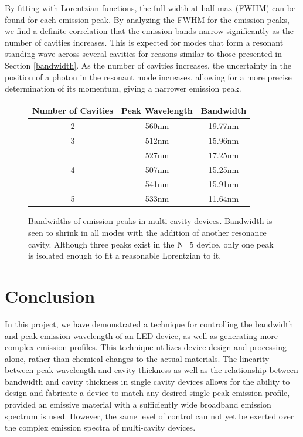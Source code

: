 \documentclass{report}
\begin{document}
        By fitting with Lorentzian functions, the full width at half max (FWHM) can be found for each emission peak. By analyzing the FWHM for the emission peaks, we find a definite correlation that the emission bands narrow significantly as the number of cavities increases. This is expected for modes that form a resonant standing wave across several cavities for reasons similar to those presented in Section \ref{bandwidth}. As the number of cavities increases, the uncertainty in the position of a photon in the resonant mode increases, allowing for a more precise determination of its momentum, giving a narrower emission peak.
        \begin{figure}
            \centering
            \renewcommand{\arraystretch}{1.5}
            \setlength{\tabcolsep}{15pt}
            \begin{tabular}{|c|c|c|}
                \hline
                Number of Cavities & Peak Wavelength & Bandwidth \\
                \hline
                2 & 560nm & 19.77nm \\
                \hline
                3 & 512nm & 15.96nm \\
                  & 527nm & 17.25nm \\
                \hline
                4 & 507nm & 15.25nm \\
                  & 541nm & 15.91nm \\
                \hline
                5 & 533nm & 11.64nm \\
                \hline
            \end{tabular}

            \caption{Bandwidths of emission peaks in multi-cavity devices. Bandwidth is seen to shrink in all modes with the addition of another resonance cavity. Although three peaks exist in the N=5 device, only one peak is isolated enough to fit a reasonable Lorentzian to it.}
            \label{fwhm}
        \end{figure}


\chapter{Conclusion} \label{concl}

    In this project, we have demonstrated a technique for controlling the bandwidth and peak emission wavelength of an LED device, as well as generating more complex emission profiles. This technique utilizes device design and processing alone, rather than chemical changes to the actual materials. The linearity between peak wavelength and cavity thickness as well as the relationship between bandwidth and cavity thickness in single cavity devices allows for the ability to design and fabricate a device to match any desired single peak emission profile, provided  an emissive material with a sufficiently wide broadband emission spectrum is used. However, the same level of control can not yet be exerted over the complex emission spectra of multi-cavity devices.
    
\end{document}
